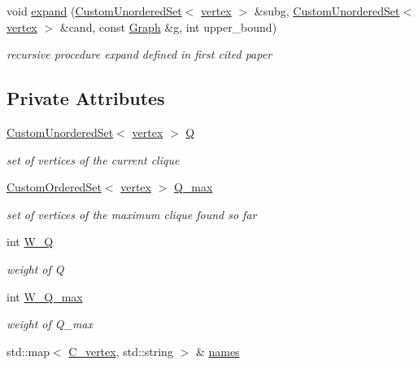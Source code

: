 \begin{DoxyCompactItemize}
void \hyperlink{classTTT__maximal__weighted__clique_a2fbe56bc02d8801552df3a0e161154be}{expand} (\hyperlink{classCustomUnorderedSet}{Custom\+Unordered\+Set}$<$ \hyperlink{classTTT__maximal__weighted__clique_ac6a30ba8fb726c9c83eafe9dc451a799}{vertex} $>$ \&subg, \hyperlink{classCustomUnorderedSet}{Custom\+Unordered\+Set}$<$ \hyperlink{classTTT__maximal__weighted__clique_ac6a30ba8fb726c9c83eafe9dc451a799}{vertex} $>$ \&cand, const \hyperlink{structGraph}{Graph} \&g, int upper\+\_\+bound)
\begin{DoxyCompactList}\small\item\em recursive procedure expand defined in first cited paper \end{DoxyCompactList}\end{DoxyCompactItemize}
\subsection*{Private Attributes}
\begin{DoxyCompactItemize}
\item 
\hyperlink{classCustomUnorderedSet}{Custom\+Unordered\+Set}$<$ \hyperlink{classTTT__maximal__weighted__clique_ac6a30ba8fb726c9c83eafe9dc451a799}{vertex} $>$ \hyperlink{classTTT__maximal__weighted__clique_a0aa8da5eb10ff394b9b3d712cedbc09e}{Q}
\begin{DoxyCompactList}\small\item\em set of vertices of the current clique \end{DoxyCompactList}\item 
\hyperlink{classCustomOrderedSet}{Custom\+Ordered\+Set}$<$ \hyperlink{classTTT__maximal__weighted__clique_ac6a30ba8fb726c9c83eafe9dc451a799}{vertex} $>$ \hyperlink{classTTT__maximal__weighted__clique_a0c6de9332be4c12cd4c669dbfe3e2011}{Q\+\_\+max}
\begin{DoxyCompactList}\small\item\em set of vertices of the maximum clique found so far \end{DoxyCompactList}\item 
int \hyperlink{classTTT__maximal__weighted__clique_aff8ee11dcab917ea5c3b219f1fd4bc03}{W\+\_\+Q}
\begin{DoxyCompactList}\small\item\em weight of Q \end{DoxyCompactList}\item 
int \hyperlink{classTTT__maximal__weighted__clique_a200b7ecc6f47b87e5ad2b838d4b2f1f7}{W\+\_\+\+Q\+\_\+max}
\begin{DoxyCompactList}\small\item\em weight of Q\+\_\+max \end{DoxyCompactList}\item 
std\+::map$<$ \hyperlink{clique__covering__graph_8hpp_a9cb45047ea8c5ed95a8cfa90494345aa}{C\+\_\+vertex}, std\+::string $>$ \& \hyperlink{classTTT__maximal__weighted__clique_ac45f3ecc0934fd36c67c8bccafeff3d0}{names}
\end{DoxyCompactItemize}


